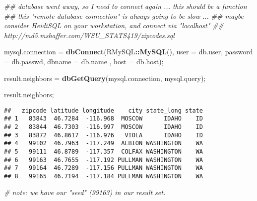 \documentclass[
]{article}
\newenvironment{Shaded}{\begin{snugshade}}{\end{snugshade}}
\newcommand{\CommentTok}[1]{\textcolor[rgb]{0.56,0.35,0.01}{\textit{#1}}}
\newcommand{\DataTypeTok}[1]{\textcolor[rgb]{0.13,0.29,0.53}{#1}}
\newcommand{\KeywordTok}[1]{\textcolor[rgb]{0.13,0.29,0.53}{\textbf{#1}}}
\newcommand{\NormalTok}[1]{#1}
\newcommand{\OperatorTok}[1]{\textcolor[rgb]{0.81,0.36,0.00}{\textbf{#1}}}
\newcommand{\StringTok}[1]{\textcolor[rgb]{0.31,0.60,0.02}{#1}}
\begin{document}
\begin{Shaded}
\begin{Highlighting}[]
\CommentTok{\#\# database went away, so I need to connect again ... this should be a function}
\CommentTok{\#\# this "remote database connection" is always going to be slow ... }
\CommentTok{\#\# maybe consider HeidiSQL on your workstation, and connect via "localhost"}
\CommentTok{\#\# http://md5.mshaffer.com/WSU\_STATS419/zipcodes.sql}

\NormalTok{mysql.connection =}\StringTok{ }\KeywordTok{dbConnect}\NormalTok{(RMySQL}\OperatorTok{::}\KeywordTok{MySQL}\NormalTok{(),}
                            \DataTypeTok{user =}\NormalTok{ db.user,}
                            \DataTypeTok{password =}\NormalTok{ db.passwd,}
                            \DataTypeTok{dbname =}\NormalTok{ db.name ,}
                            \DataTypeTok{host =}\NormalTok{ db.host);}

\NormalTok{result.neighbors =}\StringTok{ }\KeywordTok{dbGetQuery}\NormalTok{(mysql.connection, mysql.query);}

\NormalTok{result.neighbors;}
\end{Highlighting}
\end{Shaded}

\begin{verbatim}
##   zipcode latitude longitude    city state_long state
## 1   83843  46.7284  -116.968  MOSCOW      IDAHO    ID
## 2   83844  46.7303  -116.997  MOSCOW      IDAHO    ID
## 3   83872  46.8617  -116.976   VIOLA      IDAHO    ID
## 4   99102  46.7963  -117.249  ALBION WASHINGTON    WA
## 5   99111  46.8789  -117.357  COLFAX WASHINGTON    WA
## 6   99163  46.7655  -117.192 PULLMAN WASHINGTON    WA
## 7   99164  46.7289  -117.156 PULLMAN WASHINGTON    WA
## 8   99165  46.7194  -117.184 PULLMAN WASHINGTON    WA
\end{verbatim}

\begin{Shaded}
\begin{Highlighting}[]
\CommentTok{\# note: we have our "seed" (99163) in our result set.}
\end{Highlighting}
\end{Shaded}
\end{document}
